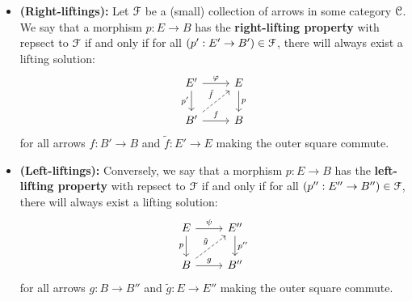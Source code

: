             \begin{definition} \label{def: lifting_properties}
                \noindent
                \begin{itemize}
                    \item \textbf{(Right-liftings):} Let $\mathcal{F}$ be a (small) collection of arrows in some category $\mathcal{C}$. We say that a morphism $p: E \to B$ has the \textbf{right-lifting property} with repsect to $\mathcal{F}$ if and only if for all $(p': E' \to B') \in \mathcal{F}$, there will always exist a lifting solution:
                        $$
                            \begin{tikzcd}
                            	{E'} & E \\
                            	{B'} & B
                            	\arrow["{p'}"', from=1-1, to=2-1]
                            	\arrow["f", from=2-1, to=2-2]
                            	\arrow["p", from=1-2, to=2-2]
                            	\arrow["\varphi", from=1-1, to=1-2]
                            	\arrow["{\tilde{f}}", dashed, from=2-1, to=1-2]
                            \end{tikzcd}
                        $$
                    for all arrows $f: B' \to B$ and $\tilde{f}: E' \to E$ making the outer square commute. 
                    \item \textbf{(Left-liftings):} Conversely, we say that a morphism $p: E \to B$ has the \textbf{left-lifting property} with repsect to $\mathcal{F}$ if and only if for all $(p'': E'' \to B'') \in \mathcal{F}$, there will always exist a lifting solution:
                        $$
                            \begin{tikzcd}
                            	{E} & {E''} \\
                            	{B} & {B''}
                            	\arrow["{p}"', from=1-1, to=2-1]
                            	\arrow["g", from=2-1, to=2-2]
                            	\arrow["{p''}", from=1-2, to=2-2]
                            	\arrow["\psi", from=1-1, to=1-2]
                            	\arrow["{\tilde{g}}", dashed, from=2-1, to=1-2]
                            \end{tikzcd}
                        $$
                    for all arrows $g: B \to B''$ and $\tilde{g}: E \to E''$ making the outer square commute.
                \end{itemize}
            \end{definition}
